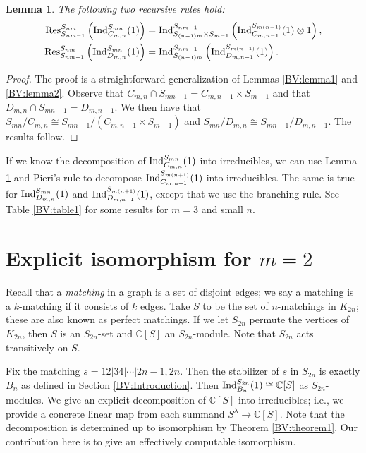 \documentclass[12pt]{amsart}
\newtheorem{lemma}[theorem]{Lemma}
\numberwithin{theorem}{section}
\newcommand{\CC}{\mathbb{C}}
\newcommand{\Ind}{\textup{Ind}}
\newcommand{\Res}{\textup{Res}}
\begin{document}
\begin{lemma}\label{BV:lemma3}
The following two recursive rules hold:
\begin{align*}
\Res_{S_{nm-1}}^{S_{nm}}\left(\Ind_{C_{m,n}}^{S_{mn}}(1)\right) &= \Ind_{S_{(n-1)m} \times S_{m-1}}^{S_{nm-1}}\left(\Ind_{C_{m,n-1}}^{S_{m(n-1)}}(1) \otimes 1\right), \\
\Res_{S_{nm-1}}^{S_{nm}}\left(\Ind_{D_{m,n}}^{S_{mn}}(1)\right) &= \Ind_{S_{(n-1)m} }^{S_{nm-1}}\left(\Ind_{D_{m,n-1}}^{S_{m(n-1)}}(1)\right).
\end{align*}
\end{lemma}
\begin{proof}
The proof is a straightforward generalization of Lemmas \ref{BV:lemma1} and \ref{BV:lemma2}.
Observe that $C_{m,n} \cap S_{mn-1} = C_{m,n-1} \times S_{m-1}$ and that $D_{m,n} \cap S_{mn-1} = D_{m,n-1}$.
We then have that $S_{mn} / C_{m,n} \cong S_{mn-1} / (C_{m,n-1} \times S_{m-1})$ and 
$S_{mn} / D_{m,n} \cong S_{mn-1} / D_{m,n-1}$.
The results follow.
\end{proof}
If we know the decomposition of $\Ind_{C_{m,n}}^{S_{mn}}(1)$ into irreducibles, we can use Lemma \ref{BV:lemma3} and Pieri's rule to decompose $\Ind_{C_{m,n+1}}^{S_{m(n+1)}}(1)$ into irreducibles.
The same is true for $\Ind_{D_{m,n}}^{S_{mn}}(1)$ and $\Ind_{D_{m,n+1}}^{S_{m(n+1)}}(1)$, except that we use the branching rule.
See Table \ref{BV:table1} for some results for $m=3$ and small $n$.

\section{Explicit isomorphism for $m=2$}\label{BV:section3}
Recall that a {\em matching} in a graph is a set of disjoint edges; we say a matching is a $k$-matching if it consists of $k$ edges.
Take $S$ to be the set of $n$-matchings in $K_{2n}$; these are also known as perfect matchings.
If we let $S_{2n}$ permute the vertices of $K_{2n}$, then $S$ is an $S_{2n}$-set and $\CC[S]$ an $S_{2n}$-module.
Note that $S_{2n}$ acts transitively on $S$.


Fix the matching $s = 12|34|\cdots|2n-1,2n$.
Then the stabilizer of $s$ in $S_{2n}$ is exactly $B_n$ as defined in Section 
\ref{BV:Introduction}.
Then $\Ind_{B_n}^{S_{2n}}(1) \cong \CC[S]$ as $S_{2n}$-modules.
We give an explicit decomposition of $\CC[S]$ into irreducibles; i.e., we provide a concrete linear map from each summand $S^\lambda \to \CC[S]$.
Note that the decomposition is determined up to isomorphism by Theorem \ref{BV:theorem1}.
Our contribution here is to give an effectively computable isomorphism.
\end{document}
